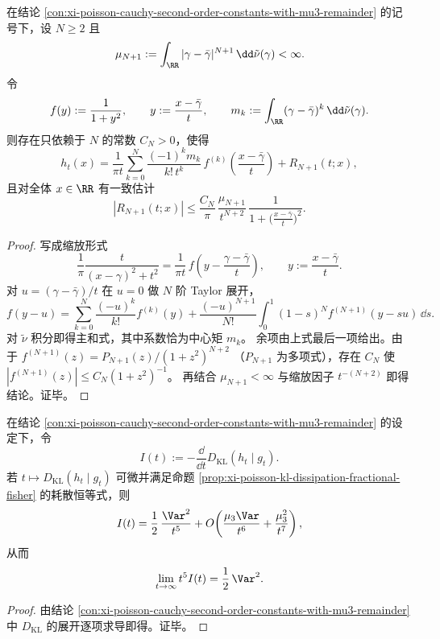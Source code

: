 \begin{theorem}\label{thm:xi-poisson-cauchy-all-order-normal-form-uniform-remainder}
在结论 \ref{con:xi-poisson-cauchy-second-order-constants-with-mu3-remainder} 的记号下，设 \(N\ge2\) 且
\[
\mu_{N+1}:=\int_{\RR}|\gamma-\bar\gamma|^{N+1}\,\dd\tilde\nu(\gamma)<\infty.
\]
令
\[
f(y):=\frac{1}{1+y^2},\qquad y:=\frac{x-\bar\gamma}{t},\qquad
m_k:=\int_{\RR}(\gamma-\bar\gamma)^k\,\dd\tilde\nu(\gamma).
\]
则存在只依赖于 \(N\) 的常数 \(C_N>0\)，使得
\[
h_t(x)
=\frac{1}{\pi t}\sum_{k=0}^{N}\frac{(-1)^k m_k}{k!\,t^k}\,
f^{(k)}\!\left(\frac{x-\bar\gamma}{t}\right)
+R_{N+1}(t;x),
\]
且对全体 \(x\in\RR\) 有一致估计
\[
|R_{N+1}(t;x)|
\le \frac{C_N}{\pi}\,
\frac{\mu_{N+1}}{t^{N+2}}\,
\frac{1}{1+\bigl(\frac{x-\bar\gamma}{t}\bigr)^2}.
\]
\end{theorem}
\begin{proof}
写成缩放形式
\[
\frac{1}{\pi}\frac{t}{(x-\gamma)^2+t^2}
=\frac{1}{\pi t}\,
f\!\left(y-\frac{\gamma-\bar\gamma}{t}\right),\qquad
y:=\frac{x-\bar\gamma}{t}.
\]
对 \(u=(\gamma-\bar\gamma)/t\) 在 \(u=0\) 做 \(N\) 阶 Taylor 展开，
\[
f(y-u)=\sum_{k=0}^{N}\frac{(-u)^k}{k!}f^{(k)}(y)
+\frac{(-u)^{N+1}}{N!}\int_0^1(1-s)^N f^{(N+1)}(y-su)\,\dd s.
\]
对 \(\tilde\nu\) 积分即得主和式，其中系数恰为中心矩 \(m_k\)。
余项由上式最后一项给出。由于
\(
f^{(N+1)}(z)=P_{N+1}(z)/(1+z^2)^{N+2}
\)
（\(P_{N+1}\) 为多项式），存在 \(C_N\) 使
\(
|f^{(N+1)}(z)|\le C_N(1+z^2)^{-1}
\)。
再结合 \(\mu_{N+1}<\infty\) 与缩放因子 \(t^{-(N+2)}\) 即得结论。证毕。
\end{proof}
\begin{corollary}\label{cor:xi-poisson-cauchy-fisher-krein-tail-half-var2}
在结论 \ref{con:xi-poisson-cauchy-second-order-constants-with-mu3-remainder} 的设定下，令
\[
I(t):=-\frac{\dd}{\dd t}D_{\mathrm{KL}}(h_t\mid g_t).
\]
若 \(t\mapsto D_{\mathrm{KL}}(h_t\mid g_t)\) 可微并满足命题
\ref{prop:xi-poisson-kl-dissipation-fractional-fisher} 的耗散恒等式，则
\[
I(t)=\frac12\,\frac{\Var^2}{t^5}
+O\!\left(\frac{\mu_3\Var}{t^6}+\frac{\mu_3^2}{t^7}\right),
\]
从而
\[
\lim_{t\to\infty}t^5 I(t)=\frac12\,\Var^2.
\]
\end{corollary}
\begin{proof}
由结论 \ref{con:xi-poisson-cauchy-second-order-constants-with-mu3-remainder}
中 \(D_{\mathrm{KL}}\) 的展开逐项求导即得。证毕。
\end{proof}

